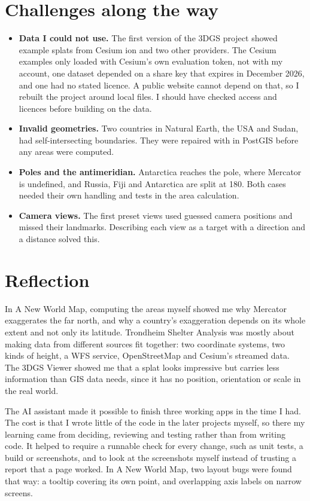\section{Challenges along the way}\label{sec:challenges}

\begin{itemize}
  \item \textbf{Data I could not use.} The first version of the 3DGS project showed example splats from Cesium ion and two other providers. The Cesium examples only loaded with Cesium's own evaluation token, not with my account, one dataset depended on a share key that expires in December 2026, and one had no stated licence. A public website cannot depend on that, so I rebuilt the project around local files. I should have checked access and licences before building on the data.
  \item \textbf{Invalid geometries.} Two countries in Natural Earth, the USA and Sudan, had self-intersecting boundaries. They were repaired with  in PostGIS before any areas were computed.
  \item \textbf{Poles and the antimeridian.} Antarctica reaches the pole, where Mercator is undefined, and Russia, Fiji and Antarctica are split at 180\dg{}. Both cases needed their own handling and tests in the area calculation.
  \item \textbf{Camera views.} The first preset views used guessed camera positions and missed their landmarks. Describing each view as a target with a direction and a distance solved this.
\end{itemize}

\section{Reflection}\label{sec:reflection}

In A New World Map, computing the areas myself showed me why Mercator exaggerates the far north, and why a country's exaggeration depends on its whole extent and not only its latitude. Trondheim Shelter Analysis was mostly about making data from different sources fit together: two coordinate systems, two kinds of height, a WFS service, OpenStreetMap and Cesium's streamed data. The 3DGS Viewer showed me that a splat looks impressive but carries less information than GIS data needs, since it has no position, orientation or scale in the real world.

The AI assistant made it possible to finish three working apps in the time I had. The cost is that I wrote little of the code in the later projects myself, so there my learning came from deciding, reviewing and testing rather than from writing code. It helped to require a runnable check for every change, such as unit tests, a build or screenshots, and to look at the screenshots myself instead of trusting a report that a page worked. In A New World Map, two layout bugs were found that way: a tooltip covering its own point, and overlapping axis labels on narrow screens.

